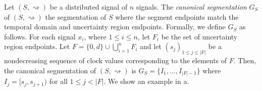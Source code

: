 \documentclass[iicol,lineno]{sn-jnl}
\renewcommand{\cref}{\Cref}
\newcommand{\ege}[1]{\textcolor{green!70!black}{\bf Ege: #1}}
\newcommand{\hb}{\rightsquigarrow}
\newcommand{\?}{\text{?}}
\newtheorem{example}{Example}
\begin{document}
	Let $(S,{\hb})$ be a distributed signal of $n$ signals.
	The \emph{canonical segmentation} $G_S$ of $(S,{\hb})$ the segmentation of $S$ where the segment endpoints match the temporal domain and uncertainty region endpoints.
	Formally, we define $G_S$ as follows.
	For each signal $x_i$, where $1 \leq i \leq n$, let $F_i$ be the set of uncertainty region endpoints.
	Let $F = \{0, d\} \cup \bigcup_{i = 1}^{n} F_i$ and let $(s_j)_{1 \leq j \leq |F|}$ be a nondecreasing sequence of clock values corresponding to the elements of $F$.
	Then, the canonical segmentation of $(S,{\hb})$ is $G_S = \{I_1, \ldots, I_{|F| - 1}\}$ where $I_j = [s_j, s_{j+1})$ for all $1 \leq j < |F|$.
	We show an example in \cref{fig:csve}a.
	
	
\end{document}
